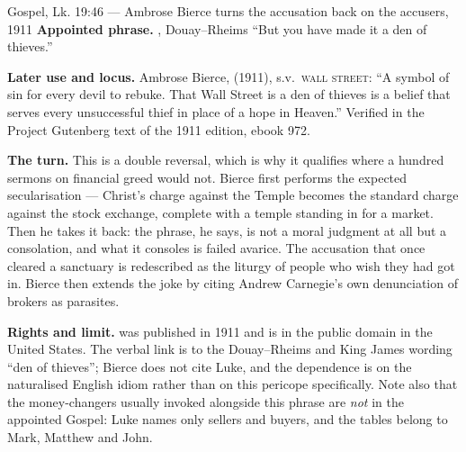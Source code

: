 \begin{afterlife}{Gospel, Lk. 19:46 --- Ambrose Bierce turns the accusation back on the accusers, 1911}
\textbf{Appointed phrase.} , Douay--Rheims ``But you have made it a den of thieves.''

\textbf{Later use and locus.} Ambrose Bierce, 
(1911), s.v.\ \textsc{wall street}: ``A symbol of sin for every devil to
rebuke. That Wall Street is a den of thieves is a belief that serves every
unsuccessful thief in place of a hope in Heaven.'' Verified in the Project
Gutenberg text of the 1911 edition, ebook 972.

\textbf{The turn.} This is a double reversal, which is why it qualifies where
a hundred sermons on financial greed would not. Bierce first performs the
expected secularisation --- Christ's charge against the Temple becomes the
standard charge against the stock exchange, complete with a temple standing in
for a market. Then he takes it back: the phrase, he says, is not a moral
judgment at all but a consolation, and what it consoles is failed avarice. The
accusation that once cleared a sanctuary is redescribed as the liturgy of
people who wish they had got in. Bierce then extends the joke by citing
Andrew Carnegie's own denunciation of brokers as parasites.

\textbf{Rights and limit.}  was published in 1911
and is in the public domain in the United States. The verbal link is to the
Douay--Rheims and King James wording ``den of thieves''; Bierce does not cite Luke, and
the dependence is on the naturalised English idiom rather than on this
pericope specifically. Note also that the money-changers usually invoked
alongside this phrase are \textit{not} in the appointed Gospel: Luke names only
sellers and buyers, and the tables belong to Mark, Matthew and John.
\end{afterlife}

